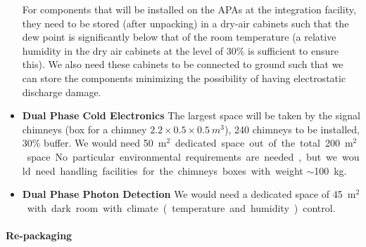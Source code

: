 \begin{itemize}
For components that will be installed on the APAs at the integration
facility, they need to be stored (after unpacking) in a dry-air
cabinets such that the dew point is significantly below that of the
room temperature (a relative humidity in the dry air cabinets at the
level of 30\% is sufficient to ensure this). We also need these
cabinets to be connected to ground such that we can store the
components minimizing the possibility of having electrostatic
discharge damage.
  \item {\bf Dual Phase Cold Electronics} The largest space will be
    taken by the signal chimneys (box for a chimney
    $2.2\times0.5\times0.5~m^3$), \num{240} chimneys to be installed,
    30\% buffer.  We would need \SI{50}{m$^2$} dedicated space out of
    the total \SI{200}{m$^2$} space.  No particular environmental
    requirements are needed, but we would need handling facilities for
    the chimneys boxes with weight $\sim$\SI{100}{kg}.
   \item {\bf Dual Phase Photon Detection} We would need a dedicated
     space of \SI{45}{m$^2$} with dark room with climate (temperature
     and humidity) control.
\end{itemize}

\paragraph{\bf Re-packaging}

